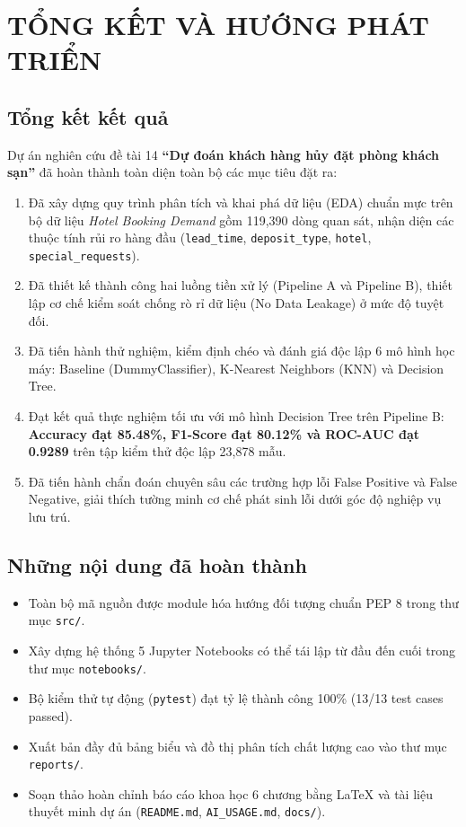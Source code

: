\chapter{TỔNG KẾT VÀ HƯỚNG PHÁT TRIỂN}

\section{Tổng kết kết quả}
Dự án nghiên cứu đề tài 14 \textbf{``Dự đoán khách hàng hủy đặt phòng khách sạn''} đã hoàn thành toàn diện toàn bộ các mục tiêu đặt ra:
\begin{enumerate}
    \item Đã xây dựng quy trình phân tích và khai phá dữ liệu (EDA) chuẩn mực trên bộ dữ liệu \textit{Hotel Booking Demand} gồm 119,390 dòng quan sát, nhận diện các thuộc tính rủi ro hàng đầu (\texttt{lead\_time}, \texttt{deposit\_type}, \texttt{hotel}, \texttt{special\_requests}).
    \item Đã thiết kế thành công hai luồng tiền xử lý (Pipeline A và Pipeline B), thiết lập cơ chế kiểm soát chống rò rỉ dữ liệu (No Data Leakage) ở mức độ tuyệt đối.
    \item Đã tiến hành thử nghiệm, kiểm định chéo và đánh giá độc lập 6 mô hình học máy: Baseline (DummyClassifier), K-Nearest Neighbors (KNN) và Decision Tree.
    \item Đạt kết quả thực nghiệm tối ưu với mô hình Decision Tree trên Pipeline B: \textbf{Accuracy đạt 85.48\%, F1-Score đạt 80.12\% và ROC-AUC đạt 0.9289} trên tập kiểm thử độc lập 23,878 mẫu.
    \item Đã tiến hành chẩn đoán chuyên sâu các trường hợp lỗi False Positive và False Negative, giải thích tường minh cơ chế phát sinh lỗi dưới góc độ nghiệp vụ lưu trú.
\end{enumerate}

\section{Những nội dung đã hoàn thành}
\begin{itemize}
    \item Toàn bộ mã nguồn được module hóa hướng đối tượng chuẩn PEP 8 trong thư mục \texttt{src/}.
    \item Xây dựng hệ thống 5 Jupyter Notebooks có thể tái lập từ đầu đến cuối trong thư mục \texttt{notebooks/}.
    \item Bộ kiểm thử tự động (\texttt{pytest}) đạt tỷ lệ thành công 100\% (13/13 test cases passed).
    \item Xuất bản đầy đủ bảng biểu và đồ thị phân tích chất lượng cao vào thư mục \texttt{reports/}.
    \item Soạn thảo hoàn chỉnh báo cáo khoa học 6 chương bằng LaTeX và tài liệu thuyết minh dự án (\texttt{README.md}, \texttt{AI\_USAGE.md}, \texttt{docs/}).
\end{itemize}

